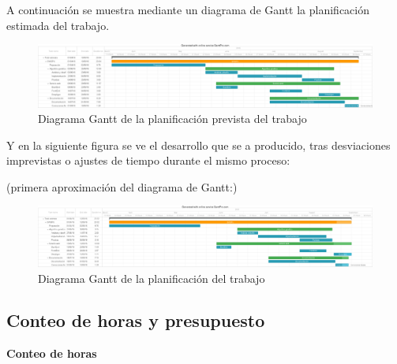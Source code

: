 A continuación se muestra mediante un diagrama de Gantt la planificación estimada del trabajo.

\bigskip
\begin{figure}[h]
	\centering
	\includegraphics[width=1.0\linewidth]{../images/gantt_prevista}
	\caption[Diagrama Gantt de la planificación prevista del trabajo]{Diagrama Gantt de la planificación prevista del trabajo}
	\label{fig:gantt_previsto}
\end{figure}

\bigskip
Y en la siguiente figura se ve el desarrollo que se a producido, tras desviaciones imprevistas o ajustes de tiempo durante el mismo proceso:


(primera aproximación del diagrama de Gantt:)


\bigskip
\begin{figure}[h]
	\centering
	\includegraphics[width=1.0\linewidth]{../images/gantt}
	\caption[Diagrama Gantt de la planificación del trabajo]{Diagrama Gantt de la planificación del trabajo}
	\label{fig:gantt}
\end{figure}


\bigskip
\subsection{Conteo de horas y presupuesto}
\bigskip

\textbf{Conteo de horas}

